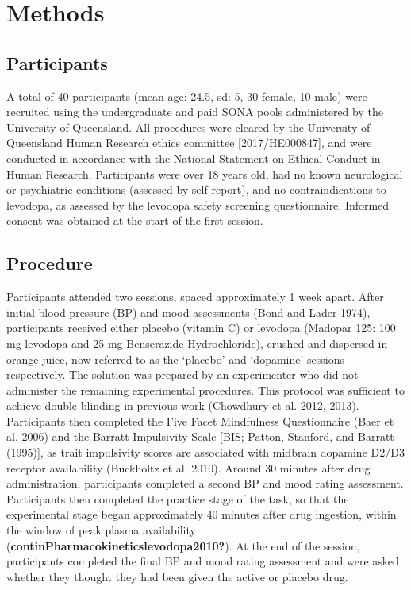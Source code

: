 \documentclass{article}
\begin{document}
\hypertarget{methods}{%
\section{Methods}\label{methods}}

\label{sec:Methods}

\hypertarget{participants}{%
\subsection{Participants}\label{participants}}

A total of 40 participants (mean age: 24.5, sd: 5, 30 female, 10 male)
were recruited using the undergraduate and paid SONA pools administered
by the University of Queensland. All procedures were cleared by the
University of Queensland Human Research ethics committee
{[}2017/HE000847{]}, and were conducted in accordance with the National
Statement on Ethical Conduct in Human Research. Participants were over
18 years old, had no known neurological or psychiatric conditions
(assessed by self report), and no contraindications to levodopa, as
assessed by the levodopa safety screening questionnaire. Informed
consent was obtained at the start of the first session.

\hypertarget{procedure}{%
\subsection{Procedure}\label{procedure}}

Participants attended two sessions, spaced approximately 1 week apart.
After initial blood pressure (BP) and mood assessments (Bond and Lader
1974), participants received either placebo (vitamin C) or levodopa
(Madopar 125: 100 mg levodopa and 25 mg Benserazide Hydrochloride),
crushed and dispersed in orange juice, now referred to as the `placebo'
and `dopamine' sessions respectively. The solution was prepared by an
experimenter who did not administer the remaining experimental
procedures. This protocol was sufficient to achieve double blinding in
previous work (Chowdhury et al. 2012, 2013). Participants then completed
the Five Facet Mindfulness Questionnaire (Baer et al. 2006) and the
Barratt Impulsivity Scale {[}BIS; Patton, Stanford, and Barratt
(1995){]}, as trait impulsivity scores are associated with midbrain
dopamine D2/D3 receptor availability (Buckholtz et al. 2010). Around 30
minutes after drug administration, participants completed a second BP
and mood rating assessment. Participants then completed the practice
stage of the task, so that the experimental stage began approximately 40
minutes after drug ingestion, within the window of peak plasma
availability (\textbf{continPharmacokineticslevodopa2010?}). At the end
of the session, participants completed the final BP and mood rating
assessment and were asked whether they thought they had been given the
active or placebo drug.
\end{document}
